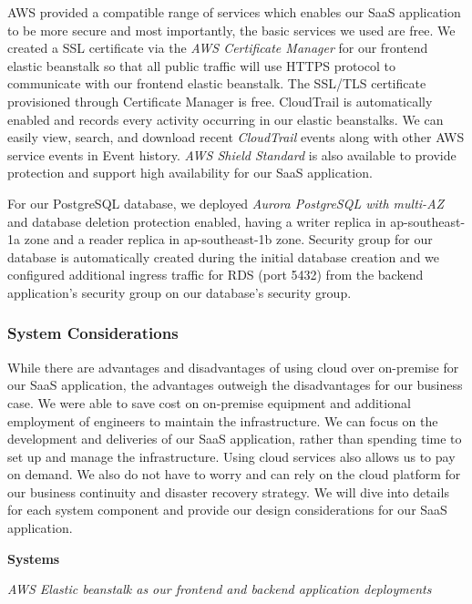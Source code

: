 \documentclass[a4paper]{article}
\begin{document}
        AWS provided a compatible range of services which enables our SaaS application to be more secure and most importantly, the basic services we used are free. We created a SSL certificate via the \emph{AWS Certificate Manager} for our frontend elastic beanstalk so that all public traffic will use HTTPS protocol to communicate with our frontend elastic beanstalk. The SSL/TLS certificate provisioned through Certificate Manager is free. CloudTrail is automatically enabled and records every activity occurring in our elastic beanstalks. We can easily view, search, and download recent \emph{CloudTrail} events along with other AWS service events in Event history. \emph{AWS Shield Standard} is also available to provide protection and support high availability for our SaaS application. 
        
        For our PostgreSQL database, we deployed \emph{Aurora PostgreSQL with multi-AZ} and database deletion protection enabled, having a writer replica in ap-southeast-1a zone and a  reader replica in ap-southeast-1b zone. Security group for our database is automatically created during the initial database creation and we configured additional ingress traffic for RDS (port 5432) from the backend application’s security group on our database’s security group. 
        
        \subsubsection{System Considerations}
        
        While there are advantages and disadvantages of using cloud over on-premise for our SaaS application, the advantages outweigh the disadvantages for our business case. We were able to save cost on on-premise equipment and additional employment of engineers to maintain the infrastructure. We can focus on the development and deliveries of our SaaS application, rather than spending time to set up and manage the infrastructure. Using cloud services also allows us to pay on demand. We also do not have to worry and can rely on the cloud platform for our business continuity and disaster recovery strategy. We will dive into details for each system component and provide our design considerations for our SaaS application.
        
            \textbf{Systems}
            
            \textit{AWS Elastic beanstalk as our frontend and backend application deployments}
            
\end{document}
